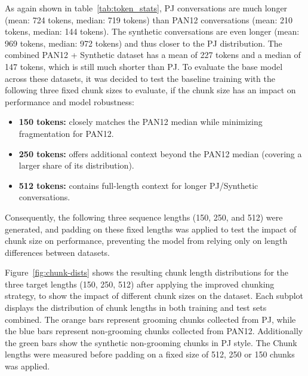 As again shown in table~\ref{tab:token_stats}, PJ conversations are much longer (mean: 724 tokens, median: 719 tokens) than PAN12 conversations (mean: 210 tokens, median: 144 tokens). The synthetic conversations are even longer (mean: 969 tokens, median: 972 tokens) and thus closer to the PJ distribution. The combined PAN12 + Synthetic dataset has a mean of 227 tokens and a median of 147 tokens, which is still much shorter than PJ. 
To evaluate the base model across these datasets, it was decided to test the baseline training with the following three fixed chunk sizes to evaluate, if the chunk size has an impact on performance and model robustness:
\begin{itemize}
  \item \textbf{150 tokens:} closely matches the PAN12 median while minimizing fragmentation for PAN12.
  \item \textbf{250 tokens:} offers additional context beyond the PAN12 median (covering a larger share of its distribution).
  \item \textbf{512 tokens:} contains full-length context for longer PJ/Synthetic conversations.
\end{itemize}

Consequently, the following three sequence lengths (150, 250, and 512) were generated, and padding on these fixed lengths was applied to test the impact of chunk size on performance, preventing the model from relying only on length differences between datasets.


Figure~\ref{fig:chunk-dists} shows the resulting chunk length distributions for the three target lengths (150, 250, 512) after applying the improved chunking strategy, to show the impact of different chunk sizes on the dataset. Each subplot displays the distribution of chunk lengths in both training and test sets combined. The orange bars represent grooming chunks collected from PJ, while the blue bars represent non-grooming chunks collected from PAN12. Additionally the green bars show the synthetic non-grooming chunks in PJ style. The Chunk lengths were measured before padding on a fixed size of 512, 250 or 150 chunks was applied.



